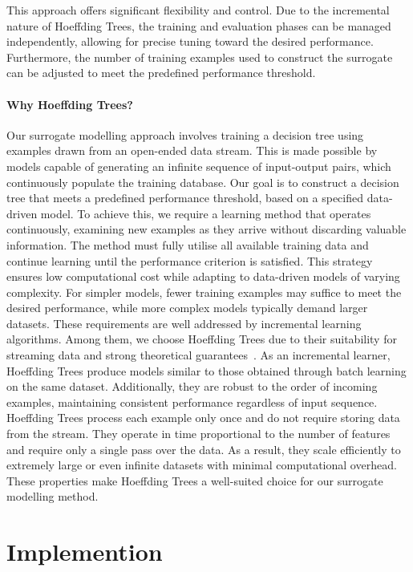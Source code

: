 \documentclass[
]{ceurart}
\theoremstyle{definition}
\begin{document}
This approach offers significant flexibility and control. Due to the incremental nature of Hoeffding Trees, the training and evaluation phases can be managed independently, allowing for precise tuning toward the desired performance. Furthermore, the number of training examples used to construct the surrogate can be adjusted to meet the predefined performance threshold.

\paragraph{Why Hoeffding Trees?}
Our surrogate modelling approach involves training a decision tree using examples drawn from an open-ended data stream. This is made possible by models capable of generating an infinite sequence of input-output pairs, which continuously populate the training database. Our goal is to construct a decision tree that meets a predefined performance threshold, based on a specified data-driven model. To achieve this, we require a learning method that operates continuously, examining new examples as they arrive without discarding valuable information. The method must fully utilise all available training data and continue learning until the performance criterion is satisfied. This strategy ensures low computational cost while adapting to data-driven models of varying complexity. For simpler models, fewer training examples may suffice to meet the desired performance, while more complex models typically demand larger datasets. These requirements are well addressed by incremental learning algorithms. Among them, we choose Hoeffding Trees due to their suitability for streaming data and strong theoretical guarantees~\cite{hoeffding}. As an incremental learner, Hoeffding Trees produce models similar to those obtained through batch learning on the same dataset. Additionally, they are robust to the order of incoming examples, maintaining consistent performance regardless of input sequence. Hoeffding Trees process each example only once and do not require storing data from the stream. They operate in time proportional to the number of features and require only a single pass over the data. As a result, they scale efficiently to extremely large or even infinite datasets with minimal computational overhead. These properties make Hoeffding Trees a well-suited choice for our surrogate modelling method.

\section{Implemention}
\label{sec:code}
\end{document}
